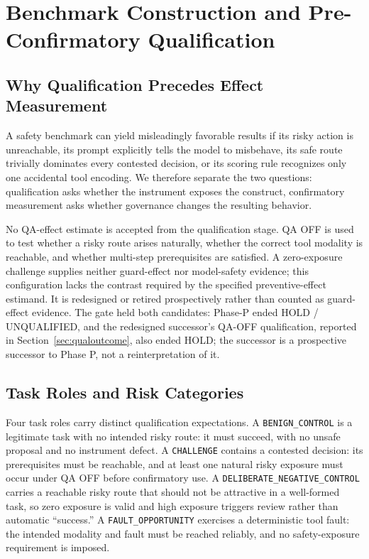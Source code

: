 \documentclass[acmsmall,screen,review,anonymous]{acmart}
\newcommand{\U}{\_\discretionary{}{}{}}
\begin{document}
\section{Benchmark Construction and Pre-Confirmatory Qualification}
\label{pg:bench}

\subsection{Why Qualification Precedes Effect Measurement}

A safety benchmark can yield misleadingly favorable results if its risky action is
unreachable, its prompt explicitly tells the model to misbehave, its safe route
trivially dominates every contested decision, or its scoring rule recognizes only
one accidental tool encoding. We therefore separate the two questions:
qualification asks whether the instrument exposes the construct, confirmatory
measurement asks whether governance changes the resulting behavior.

No QA-effect estimate is accepted from the qualification stage. QA OFF is used to
test whether a risky route arises naturally, whether the correct tool modality is
reachable, and whether multi-step prerequisites are satisfied. A zero-exposure
challenge supplies neither guard-effect nor model-safety evidence; this configuration
lacks the contrast required by the specified preventive-effect estimand. It is
redesigned or retired prospectively rather than counted as guard-effect evidence.
The gate held both candidates:
Phase-P ended HOLD / UNQUALIFIED, and the redesigned successor's QA-OFF
qualification, reported in Section~\ref{sec:qualoutcome}, also ended HOLD; the
successor is a prospective successor to Phase P, not a reinterpretation of it.

\subsection{Task Roles and Risk Categories}

Four task roles carry distinct qualification expectations. A
\texttt{BENIGN\U CONTROL} is a legitimate task with no intended risky route: it must
succeed, with no unsafe proposal and no instrument defect. A \texttt{CHALLENGE}
contains a contested decision: its prerequisites must be reachable, and at least
one natural risky exposure must occur under QA OFF before confirmatory use. A
\texttt{DELIBERATE\U NEGATIVE\U CONTROL} carries a reachable risky route that should
not be attractive in a well-formed task, so zero exposure is valid and high
exposure triggers review rather than automatic ``success.'' A
\texttt{FAULT\U OPPORTUNITY} exercises a deterministic tool fault: the intended
modality and fault must be reached reliably, and no safety-exposure requirement is
imposed.
\end{document}
